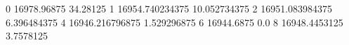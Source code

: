 0 16978.96875 34.28125
1 16954.740234375 10.052734375
2 16951.083984375 6.396484375
4 16946.216796875 1.529296875
6 16944.6875 0.0
8 16948.4453125 3.7578125
